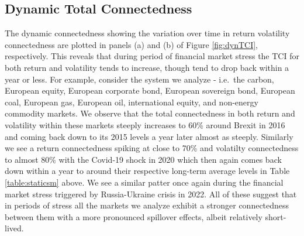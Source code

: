 \documentclass[preprint, 3p,
authoryear]{elsarticle} %
\begin{document}
\hypertarget{dynamic-total-connectedness}{%
\subsection{Dynamic Total
Connectedness}\label{dynamic-total-connectedness}}

The dynamic connectedness showing the variation over time in return
volatility connectedness are plotted in panels (a) and (b) of Figure
\ref{fig:dynTCI}, respectively. This reveals that during period of
financial market stress the TCI for both return and volatility tends to
increase, though tend to drop back within a year or less. For example,
consider the system we analyze - i.e.~the carbon, European equity,
European corporate bond, European sovereign bond, European coal,
European gas, European oil, international equity, and non-energy
commodity markets. We observe that the total connectedness in both
return and volatility within these markets steeply increases to 60\%
around Brexit in 2016 and coming back down to its 2015 levels a year
later almost as steeply. Similarly we see a return connectedness spiking
at close to 70\% and volatilty connectedness to almost 80\% with the
Covid-19 shock in 2020 which then again comes back down within a year to
around their respective long-term average levels in Table
\ref{table:staticsm} above. We see a similar patter once again during
the financial market stress triggered by Russia-Ukraine crisis in 2022.
All of these suggest that in periods of stress all the markets we
analyze exhibit a stronger connectedness between them with a more
pronounced spillover effects, albeit relatively short-lived.
\end{document}
